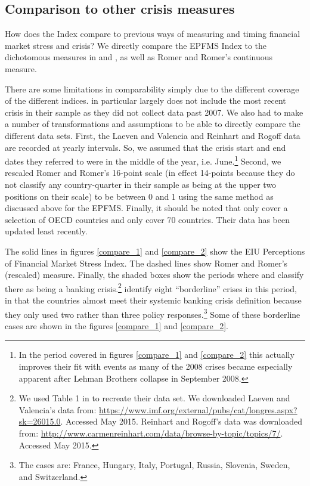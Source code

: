 \documentclass[]{article}
\begin{document}


\subsection{Comparison to other crisis
measures}\label{comparison-to-other-crisis-measures}

How does the Index compare to previous ways of measuring and timing financial market stress and crisis? We directly compare the EPFMS Index to the dichotomous measures in \cite{Reinhart2009} and \cite{laeven2013}, as well as Romer and Romer's \citeyearpar{Romer2015} continuous measure.

There are some limitations in comparability simply due to the
different coverage of the different indices. \cite{Romer2015}
in particular largely does not include the most recent crisis in their sample as they did not collect data past 2007. We also had to make a number of transformations and assumptions to be able to directly compare the different data sets. First, the Laeven and Valencia and Reinhart and Rogoff data are recorded at yearly intervals. So, we assumed that the crisis start and end dates they referred to were in the middle of the year, i.e. June.\footnote{In the period covered in figures \ref{compare_1} and \ref{compare_2} this actually improves their fit with events as many of the 2008 crises became especially apparent after Lehman Brothers collapse in September 2008.} Second, we rescaled Romer and Romer's 16-point scale (in effect 14-points because they do not classify any country-quarter in
their sample as being at the upper two positions on their scale) to be between 0 and 1 using the same method as discussed above for the EPFMS. Finally, it should be noted that \cite{Romer2015} only cover a selection of OECD countries and \cite{Reinhart2009} only cover 70 countries. Their data has been updated least recently.

The solid lines in figures \ref{compare_1} and \ref{compare_2} show the EIU Perceptions of Financial Market Stress Index. The dashed lines show Romer and Romer's (rescaled) measure. Finally, the shaded boxes show the periods where \cite{laeven2013} and \cite{Reinhart2009} classify there as being a banking crisis.\footnote{We used Table 1 in \cite{Romer2015} to recreate their data set. We downloaded Laeven and Valencia's data from: \url{https://www.imf.org/external/pubs/cat/longres.aspx?sk=26015.0}.
  Accessed May 2015. Reinhart and Rogoff's data was downloaded from:
  \url{http://www.carmenreinhart.com/data/browse-by-topic/topics/7/}.
  Accessed May 2015.} \cite{laeven2013} identify eight ``borderline'' crises in this period, in that the countries almost meet their systemic banking crisis definition because they only used two rather than three policy responses.\footnote{The cases are: France, Hungary, Italy, Portugal, Russia, Slovenia, Sweden, and Switzerland.} Some of these borderline cases are shown in the figures \ref{compare_1} and \ref{compare_2}.
\end{document}
